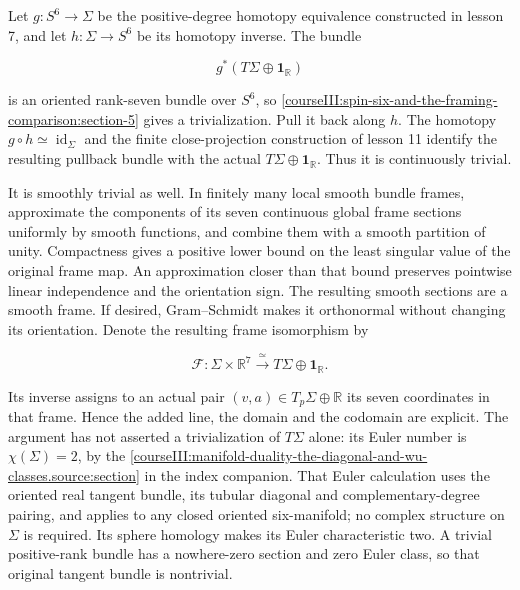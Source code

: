 \label{courseIII:spin-six-and-the-framing-comparison:section-6}\label{courseIII:spin6:6}

Let \(g:S^6\to\Sigma\) be the positive-degree homotopy equivalence constructed in lesson 7, and let \(h:\Sigma\to S^6\) be its homotopy inverse. The bundle

\begin{equation}
g^*(T\Sigma\oplus\mathbf1_{\mathbb R})
\label{courseIII:spin-six-and-the-framing-comparison:eq:6.1}
\end{equation}

is an oriented rank-seven bundle over \(S^6\), so \cref{courseIII:spin-six-and-the-framing-comparison:section-5} gives a trivialization. Pull it back along \(h\). The homotopy \(g\circ h\simeq\operatorname{id}_\Sigma\) and the finite close-projection construction of lesson 11 identify the resulting pullback bundle with the actual \(T\Sigma\oplus\mathbf1_{\mathbb R}\). Thus it is continuously trivial.

It is smoothly trivial as well. In finitely many local smooth bundle frames, approximate the components of its seven continuous global frame sections uniformly by smooth functions, and combine them with a smooth partition of unity. Compactness gives a positive lower bound on the least singular value of the original frame map. An approximation closer than that bound preserves pointwise linear independence and the orientation sign. The resulting smooth sections are a smooth frame. If desired, Gram--Schmidt makes it orthonormal without changing its orientation. Denote the resulting frame isomorphism by

\begin{equation}
\mathcal F:\Sigma\times\mathbb R^7
\xrightarrow{\ \simeq\ }T\Sigma\oplus\mathbf1_{\mathbb R}.
\label{courseIII:spin-six-and-the-framing-comparison:eq:6.2}
\end{equation}

Its inverse assigns to an actual pair \((v,a)\in T_p\Sigma\oplus\mathbb R\) its seven coordinates in that frame. Hence the added line, the domain and the codomain are explicit. The argument has not asserted a trivialization of \(T\Sigma\) alone: its Euler number is \(\chi(\Sigma)=2\), by the \cref{courseIII:manifold-duality-the-diagonal-and-wu-classes.source:section} in the index companion. That Euler calculation uses the oriented real tangent bundle, its tubular diagonal and complementary-degree pairing, and applies to any closed oriented six-manifold; no complex structure on \(\Sigma\) is required. Its sphere homology makes its Euler characteristic two. A trivial positive-rank bundle has a nowhere-zero section and zero Euler class, so that original tangent bundle is nontrivial.

